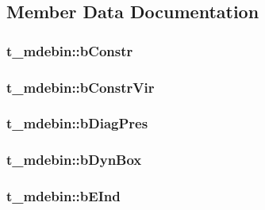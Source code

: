 \subsection{\-Member \-Data \-Documentation}
\hypertarget{structt__mdebin_ac40443aeac689606c0bf01caad4c0fc5}{
\subsubsection[{b\-Constr}]{ {\bf t\-\_\-mdebin\-::b\-Constr}}}\label{structt__mdebin_ac40443aeac689606c0bf01caad4c0fc5}
\hypertarget{structt__mdebin_af5235793de565af8c3799fc7244d3542}{
\subsubsection[{b\-Constr\-Vir}]{ {\bf t\-\_\-mdebin\-::b\-Constr\-Vir}}}\label{structt__mdebin_af5235793de565af8c3799fc7244d3542}
\hypertarget{structt__mdebin_ac0a0e9c33959982b463c9d984d6ad50d}{
\subsubsection[{b\-Diag\-Pres}]{ {\bf t\-\_\-mdebin\-::b\-Diag\-Pres}}}\label{structt__mdebin_ac0a0e9c33959982b463c9d984d6ad50d}
\hypertarget{structt__mdebin_ad294eae4fc14918c302551a9036eb15e}{
\subsubsection[{b\-Dyn\-Box}]{ {\bf t\-\_\-mdebin\-::b\-Dyn\-Box}}}\label{structt__mdebin_ad294eae4fc14918c302551a9036eb15e}
\hypertarget{structt__mdebin_ab41629e67086507b5899188f5b758f14}{
\subsubsection[{b\-E\-Ind}]{ {\bf t\-\_\-mdebin\-::b\-E\-Ind}}}\label{structt__mdebin_ab41629e67086507b5899188f5b758f14}
